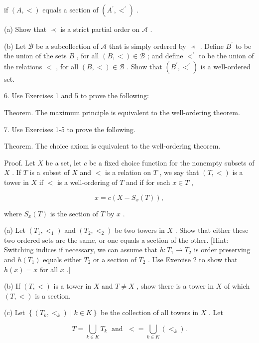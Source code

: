 \documentclass[10pt]{article}
\begin{document}
if \(\left( {A, < }\right)\) equals a section of \(\left( {{A}^{\prime },{ < }^{\prime }}\right)\) .

(a) Show that \(\prec\) is a strict partial order on \(\mathcal{A}\) .

(b) Let \(\mathcal{B}\) be a subcollection of \(\mathcal{A}\) that is simply ordered by \(\prec\) . Define \({B}^{\prime }\) to be the union of the sets \(B\) , for all \(\left( {B, < }\right)  \in  \mathcal{B}\) ; and define \({ < }^{\prime }\) to be the union of the relations \(<\) , for all \(\left( {B, < }\right)  \in  \mathcal{B}\) . Show that \(\left( {{B}^{\prime },{ < }^{\prime }}\right)\) is a well-ordered set.

6. Use Exercises 1 and 5 to prove the following:

Theorem. The maximum principle is equivalent to the well-ordering theorem.

7. Use Exercises 1-5 to prove the following.

Theorem. The choice axiom is equivalent to the well-ordering theorem.

Proof. Let \(X\) be a set, let \(c\) be a fixed choice function for the nonempty subsets of \(X\) . If \(T\) is a subset of \(X\) and \(<\) is a relation on \(T\) , we say that \(\left( {T, < }\right)\) is a tower in \(X\) if \(<\) is a well-ordering of \(T\) and if for each \(x \in  T\) ,

\[
x = c\left( {X - {S}_{x}\left( T\right) }\right) ,
\]

where \({S}_{x}\left( T\right)\) is the section of \(T\) by \(x\) .

(a) Let \(\left( {{T}_{1},{ < }_{1}}\right)\) and \(\left( {{T}_{2},{ < }_{2}}\right)\) be two towers in \(X\) . Show that either these two ordered sets are the same, or one equals a section of the other. [Hint: Switching indices if necessary, we can assume that \(h : {T}_{1} \rightarrow  {T}_{2}\) is order preserving and \(h\left( {T}_{1}\right)\) equals either \({T}_{2}\) or a section of \({T}_{2}\) . Use Exercise 2 to show that \(h\left( x\right)  = x\) for all \(x\) .]

(b) If \(\left( {T, < }\right)\) is a tower in \(X\) and \(T \neq  X\) , show there is a tower in \(X\) of which \(\left( {T, < }\right)\) is a section.

(c) Let \(\left\{  {\left( {{T}_{k},{ < }_{k}}\right)  \mid  k \in  K}\right\}\) be the collection of all towers in \(X\) . Let

\[
T = \mathop{\bigcup }\limits_{{k \in  K}}{T}_{k}\;\text{ and }\; <  = \mathop{\bigcup }\limits_{{k \in  K}}\left( { < }_{k}\right) .
\]
\end{document}
